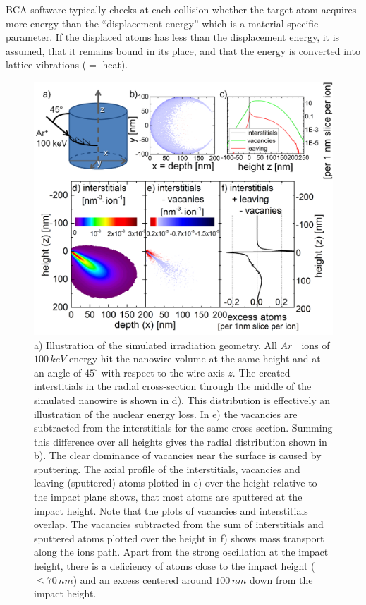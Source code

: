 \documentclass[12pt,
paper=a4,				
DIV=calc,		  %
BCOR=16mm,	  %
headinclude,
openany
]{scrbook}
\begin{document}
BCA software typically checks at each collision whether the target atom acquires more energy than the ``displacement energy'' which is a material specific parameter. If the displaced atoms has less than the displacement energy, it is assumed, that it remains bound in its place, and that the energy is converted into lattice vibrations ($=$ heat).


\clearpage
\begin{figure}[htbp]
	\centering
		\includegraphics[width=.9\textwidth]{images/deformationBCA.jpg}
		\caption{a) Illustration of the simulated irradiation geometry. All $Ar^+$ ions of $100\,keV$ energy hit the nanowire volume at the same height and at an angle of $45^\circ$ with respect to the wire axis $z$. The created interstitials in the radial cross-section through the middle of the simulated nanowire is shown in d). This distribution is effectively an illustration of the nuclear energy loss. In e) the vacancies are subtracted from the interstitials for the same cross-section. Summing this difference over all heights gives the radial distribution shown in b). The clear dominance of vacancies near the surface is caused by sputtering. The axial profile of the interstitials, vacancies and leaving (sputtered) atoms plotted in c) over the height relative to the impact plane shows, that most atoms are sputtered at the impact height. Note that the plots of vacancies and interstitials overlap. The vacancies subtracted from the sum of interstitials and sputtered atoms plotted over the height in f) shows mass transport along the ions path. Apart from the strong oscillation at the impact height, there is a deficiency of atoms close to the impact height ($\le 70\,nm$) and an excess centered around $100\,nm$ down from the impact height.} 
	\label{deformationBCA}	
\end{figure}
\end{document}
